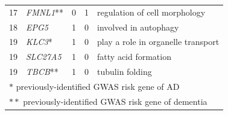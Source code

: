 \documentclass[11pt,hidelinks]{article}
\begin{document}
\begin{appendices}
\begin{table}[H]
\begin{tabular}{lllll}
   17 & \textit{FMNL1}** &   0 &   1 &  regulation of cell morphology  \\ 
   18 & \textit{EPG5} &   1 &   0 &  involved in autophagy  \\ 
   19 & \textit{KLC3}* &   1 &   0 &   play a role in organelle transport \\ 
   19 & \textit{SLC27A5} &   1 &   0 &  fatty acid formation  \\ 
   19 & \textit{TBCB}** &   1 &   0 &   tubulin folding \\ 
  \bottomrule
   \multicolumn{5}{l}{\footnotesize $\ast$ previously-identified GWAS risk gene of AD} \\
    \multicolumn{5}{l}{\footnotesize $\ast\ast$ previously-identified GWAS risk gene of dementia}
\end{tabular}
\label{tab:onlycistrans}
\end{table}
\pagebreak

\nocite{zotero-item-2967}
\nocite{stelzerGeneCardsSuiteGene2016}













\end{appendices}
\end{document}
